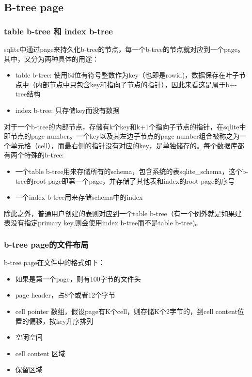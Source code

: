 \documentclass[12pt]{article}
\begin{document}
\subsection{B-tree page}\label{b-tree-page}

\subsubsection{table b-tree 和 index b-tree}\label{table-b-tree-ux548c-index-b-tree}

sqlite中通过page来持久化b-tree的节点，每一个b-tree的节点就对应到一个page。其中，又分为两种具体的用途：

\begin{itemize}
\tightlist
\item
  table b-tree: 使用64位有符号整数作为key（也即是rowid)，数据保存在叶子节点中（内部节点中只包含key和指向子节点的指针），因此来看这是属于b+-tree结构
\item
  index b-tree: 只存储key而没有数据
\end{itemize}

对于一个b-tree的内部节点，存储有k个key和k+1个指向子节点的指针，在sqlite中即节点的page number。一个key以及其左边子节点的page number组合被称之为一个单元格（cell），而最右侧的指针没有对应的key，是单独储存的。每个数据库都有两个特殊的b-tree:

\begin{itemize}
\tightlist
\item
  一个table b-tree用来存储所有的schema，包含系统的表sqlite\_schema，这个b-tree的root page即第一个page，并存储了其他表和index的root page的序号
\item
  一个index b-tree用来存储schema中的index
\end{itemize}

除此之外，普通用户创建的表则对应到一个table b-tree（有一个例外就是如果建表没有指定primary key,则会使用index b-tree而不是table b-tree)。

\subsubsection{b-tree page的文件布局}\label{b-tree-pageux7684ux6587ux4ef6ux5e03ux5c40}

b-tree page在文件中的格式如下：

\begin{itemize}
\tightlist
\item
  如果是第一个page，则有100字节的文件头
\item
  page header，占8个或者12个字节
\item
  cell pointer 数组，假设page有K个cell，则存储K个2字节的，到cell content位置的偏移，按key升序排列
\item
  空闲空间
\item
  cell content 区域
\item
  保留区域
\end{itemize}
\end{document}
